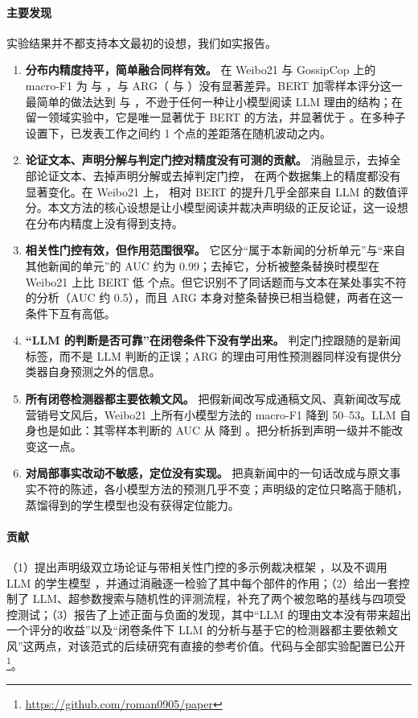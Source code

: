 \paragraph{主要发现}
实验结果并不都支持本文最初的设想，我们如实报告。
\begin{enumerate}
\item \textbf{分布内精度持平，简单融合同样有效。} \method{} 在 Weibo21 与 GossipCop 上的 macro-F1 为  与 ，与 ARG（ 与 ）没有显著差异。BERT 加零样本评分这一最简单的做法达到  与 ，不逊于任何一种让小模型阅读 LLM 理由的结构；在留一领域实验中，它是唯一显著优于 BERT 的方法，并显著优于 \method{}。在多种子设置下，已发表工作之间约 1 个点的差距落在随机波动之内。
\item \textbf{论证文本、声明分解与判定门控对精度没有可测的贡献。} 消融显示，去掉全部论证文本、去掉声明分解或去掉判定门控，\method{} 在两个数据集上的精度都没有显著变化。在 Weibo21 上，\method{} 相对 BERT 的提升几乎全部来自 LLM 的数值评分。本文方法的核心设想是让小模型阅读并裁决声明级的正反论证，这一设想在分布内精度上没有得到支持。
\item \textbf{相关性门控有效，但作用范围很窄。} 它区分“属于本新闻的分析单元”与“来自其他新闻的单元”的 AUC 约为 0.99；去掉它，分析被整条替换时模型在 Weibo21 上比 BERT 低  个点。但它识别不了同话题而与文本在某处事实不符的分析（AUC 约 0.5），而且 ARG 本身对整条替换已相当稳健，两者在这一条件下互有高低。
\item \textbf{“LLM 的判断是否可靠”在闭卷条件下没有学出来。} 判定门控跟随的是新闻标签，而不是 LLM 判断的正误；ARG 的理由可用性预测器同样没有提供分类器自身预测之外的信息。
\item \textbf{所有闭卷检测器都主要依赖文风。} 把假新闻改写成通稿文风、真新闻改写成营销号文风后，Weibo21 上所有小模型方法的 macro-F1 降到 50--53。LLM 自身也是如此：其零样本判断的 AUC 从  降到 。把分析拆到声明一级并不能改变这一点。
\item \textbf{对局部事实改动不敏感，定位没有实现。} 把真新闻中的一句话改成与原文事实不符的陈述，各小模型方法的预测几乎不变；声明级的定位只略高于随机，蒸馏得到的学生模型也没有获得定位能力。
\end{enumerate}

\paragraph{贡献}
（1）提出声明级双立场论证与带相关性门控的多示例裁决框架 \method{}，以及不调用 LLM 的学生模型 \student{}，并通过消融逐一检验了其中每个部件的作用；（2）给出一套控制了 LLM、超参数搜索与随机性的评测流程，补充了两个被忽略的基线与四项受控测试；（3）报告了上述正面与负面的发现，其中“LLM 的理由文本没有带来超出一个评分的收益”以及“闭卷条件下 LLM 的分析与基于它的检测器都主要依赖文风”这两点，对该范式的后续研究有直接的参考价值。代码与全部实验配置已公开\footnote{\url{https://github.com/roman0905/paper}}。
